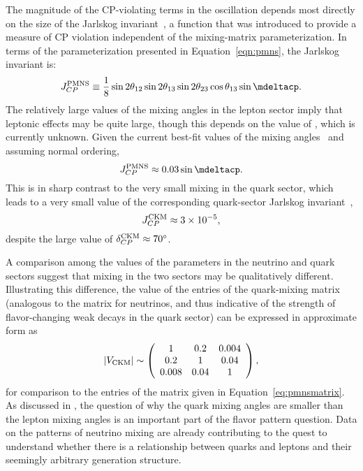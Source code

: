 The magnitude of the
CP-violating terms in the oscillation depends most directly on the
size of the Jarlskog invariant~\cite{Jarlskog:1985cw}, a function that
was introduced to provide a measure of CP violation independent of the
mixing-matrix parameterization. In terms of the parameterization
presented in Equation~\ref{eqn:pmns}, the Jarlskog invariant is:
%
\begin{equation}
J_{CP}^{\rm PMNS} \equiv \frac{1}{8} \sin 2 \theta_{12} \sin 2 \theta_{13}
\sin 2 \theta_{23} \cos \theta_{13} \sin \mdeltacp.
\end{equation}
The relatively large values of the mixing angles in the lepton sector imply that
leptonic  effects may be quite large, though this depends on
the value of \deltacp, which is currently unknown. Given the current best-fit values of the mixing angles~\cite{Esteban:2018azc,nufitweb} and assuming normal ordering,
\begin{equation}
J_{CP}^{\rm PMNS} \approx 0.03 \sin \mdeltacp.
\end{equation}
This is in sharp contrast to the very small mixing in the quark sector,  
which leads to a very small value of the corresponding quark-sector
Jarlskog invariant~\cite{Tanabashi:2018oca}, %
\begin{equation}
J_{CP}^{\rm CKM} \approx 3 \times 10^{-5},
\end{equation}
despite the large value of $\delta^{\rm CKM}_{CP}\approx70^{\circ}$.

A comparison among the values of the parameters in the neutrino
and quark sectors suggest that mixing in the two sectors may be
qualitatively different. Illustrating this difference, the value of
the entries of the  %
quark-mixing matrix (analogous to the  matrix for
neutrinos, and thus indicative of the strength of flavor-changing weak
decays in the quark sector) can be expressed in approximate form as
\begin{equation}
|V_{\rm CKM}|\sim \left(\begin{array}{ccc} 1 & 0.2 & 0.004\\ 0.2 & 1 & 0.04 \\ 0.008 & 0.04 & 1\end{array} \right),
\label{eq:ckmmatrix}
\end{equation}
for comparison to the entries of the  matrix given in Equation~\ref{eq:pmnsmatrix}.
As discussed in \cite{King:2014nza}, the question of why the quark mixing angles are
smaller than the lepton mixing angles is an important part of the %
flavor pattern question. Data on the patterns of neutrino mixing are already contributing to the quest to understand whether there is a relationship between quarks and leptons and their seemingly arbitrary generation structure.   




